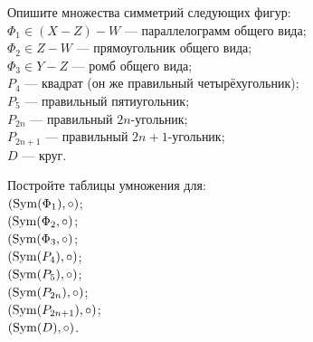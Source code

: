 \documentclass[a4paper,12pt]{article}
\begin{document}
    \problem Опишите множества симметрий следующих фигур: \\
    \sub $\Phi_1 \in (X - Z) - W$ --- параллелограмм общего вида; \\
    \sub $\Phi_2 \in Z - W$ --- прямоугольник общего вида; \\
    \sub $\Phi_3 \in Y - Z$ --- ромб общего вида; \\
    \sub $P_4$ --- квадрат (он же правильный четырёхугольник); \\
    \sub $P_5$ --- правильный пятиугольник; \\
     $P_{2n}$ --- правильный ${2n}$-угольник; \\
     $P_{2n + 1}$ --- правильный ${2n + 1}$-угольник; \\
     $D$ --- круг.
    
    \problem Постройте таблицы умножения для: \\
    \sub $(\operatorname{Sym}(\Phi_1), \circ)$; \\
    \sub $(\operatorname{Sym}(\Phi_2, \circ)$; \\
    \sub $(\operatorname{Sym}(\Phi_3, \circ)$; \\
    \sub $(\operatorname{Sym}(P_4), \circ)$; \\
     $(\operatorname{Sym}(P_5), \circ)$; \\
     $(\operatorname{Sym}(P_{2n}), \circ)$; \\
     $(\operatorname{Sym}(P_{2n + 1}), \circ)$; \\
     $(\operatorname{Sym}(D), \circ)$.
\end{document}
